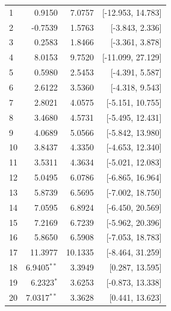 \begin{longtable}{lrrr}
1 & 0.9150 & 7.0757 & [-12.953, 14.783] \\
2 & -0.7539 & 1.5763 & [-3.843, 2.336] \\
3 & 0.2583 & 1.8466 & [-3.361, 3.878] \\
4 & 8.0153 & 9.7520 & [-11.099, 27.129] \\
5 & 0.5980 & 2.5453 & [-4.391, 5.587] \\
6 & 2.6122 & 3.5360 & [-4.318, 9.543] \\
7 & 2.8021 & 4.0575 & [-5.151, 10.755] \\
8 & 3.4680 & 4.5731 & [-5.495, 12.431] \\
9 & 4.0689 & 5.0566 & [-5.842, 13.980] \\
10 & 3.8437 & 4.3350 & [-4.653, 12.340] \\
11 & 3.5311 & 4.3634 & [-5.021, 12.083] \\
12 & 5.0495 & 6.0786 & [-6.865, 16.964] \\
13 & 5.8739 & 6.5695 & [-7.002, 18.750] \\
14 & 7.0595 & 6.8924 & [-6.450, 20.569] \\
15 & 7.2169 & 6.7239 & [-5.962, 20.396] \\
16 & 5.8650 & 6.5908 & [-7.053, 18.783] \\
17 & 11.3977 & 10.1335 & [-8.464, 31.259] \\
18 & 6.9405$^{**}$ & 3.3949 & [0.287, 13.595] \\
19 & 6.2323$^{*}$ & 3.6253 & [-0.873, 13.338] \\
20 & 7.0317$^{**}$ & 3.3628 & [0.441, 13.623] \\
\end{longtable}
